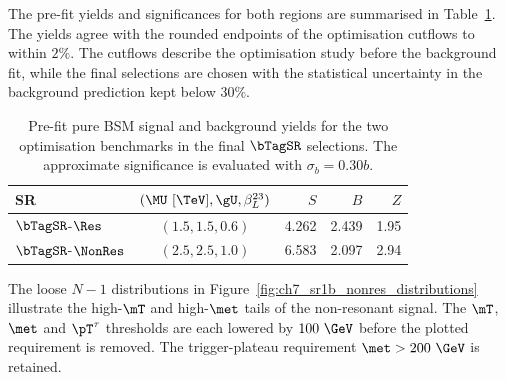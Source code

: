 The pre-fit yields and significances for both regions are summarised in Table~\ref{tab:ch7_prefit_yields}.
The yields agree with the rounded endpoints of the optimisation cutflows to within $2\%$.
The cutflows describe the optimisation study before the background fit, while the final selections are chosen with the statistical uncertainty in the background prediction kept below $30\%$.

\begin{table}[htbp]
    \centering
    \small
    \caption{Pre-fit pure BSM signal and background yields for the two optimisation benchmarks in the final $\bTagSR$ selections. The approximate significance is evaluated with $\sigma_b=0.30b$.}
    \label{tab:ch7_prefit_yields}
    \begin{tabular}{lcrrr}
        \toprule
        SR & $(\MU~[\TeV],\gU,\beta_L^{23})$ & $S$ & $B$ & $Z$ \\
        \midrule
        $\bTagSR$-$\Res$ & $(1.5,1.5,0.6)$ & 4.262 & 2.439 & 1.95 \\
        $\bTagSR$-$\NonRes$ & $(2.5,2.5,1.0)$ & 6.583 & 2.097 & 2.94 \\
        \bottomrule
    \end{tabular}
\end{table}

The loose $N-1$ distributions in Figure~\ref{fig:ch7_sr1b_nonres_distributions} illustrate the high-$\mT$ and high-$\met$ tails of the non-resonant signal.
The $\mT$, $\met$ and $\pT^\tau$ thresholds are each lowered by $100~\GeV$ before the plotted requirement is removed.
The trigger-plateau requirement $\met>200~\GeV$ is retained.

